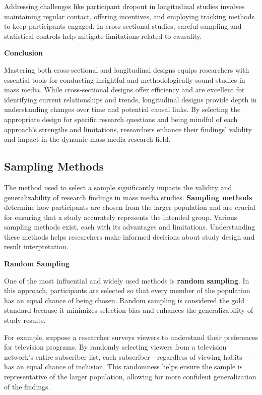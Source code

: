 \documentclass[
]{book}
\begin{document}
Addressing challenges like participant dropout in longitudinal studies involves maintaining regular contact, offering incentives, and employing tracking methods to keep participants engaged. In cross-sectional studies, careful sampling and statistical controls help mitigate limitations related to causality.

\textbf{Conclusion}

Mastering both cross-sectional and longitudinal designs equips researchers with essential tools for conducting insightful and methodologically sound studies in mass media. While cross-sectional designs offer efficiency and are excellent for identifying current relationships and trends, longitudinal designs provide depth in understanding changes over time and potential causal links. By selecting the appropriate design for specific research questions and being mindful of each approach's strengths and limitations, researchers enhance their findings' validity and impact in the dynamic mass media research field.

\subsection*{Sampling Methods}\label{sampling-methods}

The method used to select a sample significantly impacts the validity and generalizability of research findings in mass media studies. \textbf{Sampling methods} determine how participants are chosen from the larger population and are crucial for ensuring that a study accurately represents the intended group. Various sampling methods exist, each with its advantages and limitations. Understanding these methods helps researchers make informed decisions about study design and result interpretation.

\textbf{Random Sampling}

One of the most influential and widely used methods is \textbf{random sampling}. In this approach, participants are selected so that every member of the population has an equal chance of being chosen. Random sampling is considered the gold standard because it minimizes selection bias and enhances the generalizability of study results.

For example, suppose a researcher surveys viewers to understand their preferences for television programs. By randomly selecting viewers from a television network's entire subscriber list, each subscriber---regardless of viewing habits---has an equal chance of inclusion. This randomness helps ensure the sample is representative of the larger population, allowing for more confident generalization of the findings.
\end{document}
